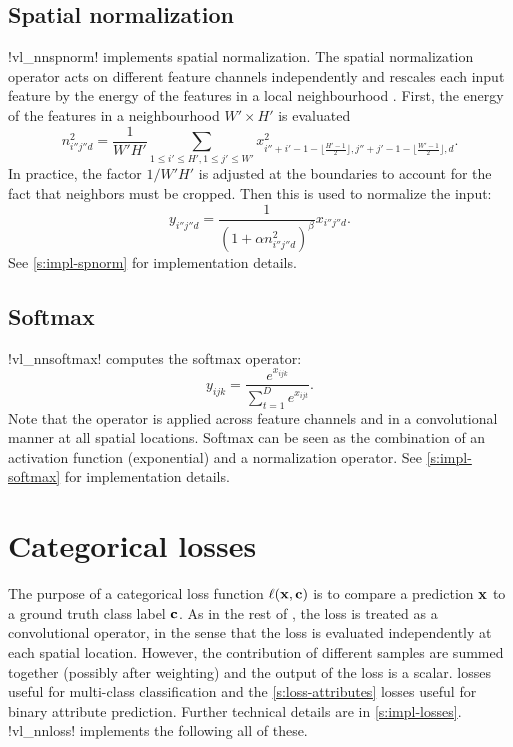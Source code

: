 \subsection{Spatial normalization}\label{s:spnorm}

!vl_nnspnorm! implements spatial normalization. The spatial normalization operator acts on different feature channels independently and rescales each input feature by the energy of the features in a local neighbourhood . First, the energy of the features in a neighbourhood $W'\times H'$ is evaluated
\[
n_{i''j''d}^2 = \frac{1}{W'H'}
\sum_{1\leq i' \leq H', 1 \leq j' \leq W'} x^2_{
i''+i'-1-\lfloor \frac{H'-1}{2}\rfloor,
j''+j'-1-\lfloor \frac{W'-1}{2}\rfloor,
d}.
\]
In practice, the factor $1/W'H'$ is adjusted at the boundaries to account for the fact that neighbors must be cropped. Then this is used to normalize the input:
\[
y_{i''j''d} = \frac{1}{(1 + \alpha n_{i''j''d}^2)^\beta} x_{i''j''d}.
\]
See \cref{s:impl-spnorm} for implementation details.

\subsection{Softmax}\label{s:softmax}

!vl_nnsoftmax! computes the softmax operator:
\[
 y_{ijk} = \frac{e^{x_{ijk}}}{\sum_{t=1}^D e^{x_{ijt}}}.
\]
Note that the operator is applied across feature channels and in a convolutional manner at all spatial locations. Softmax can be seen as the combination of an activation function (exponential) and a normalization operator. See \cref{s:impl-softmax} for implementation details.

\section{Categorical losses}\label{s:losses}

The purpose of a categorical loss function $\ell(\mathbf{x},\mathbf{c})$ is to compare a prediction $\mathbf{x}$ to a ground truth class label $\mathbf{c}$. As in the rest of \matconvnet, the loss is treated as a convolutional operator, in the sense that the loss is evaluated independently at each spatial location. However, the contribution of different samples are summed together (possibly after weighting) and the output of the loss is a scalar.  losses useful for multi-class classification and the \cref{s:loss-attributes} losses useful for binary attribute prediction. Further technical details are in \cref{s:impl-losses}. !vl_nnloss! implements the following all of these.

